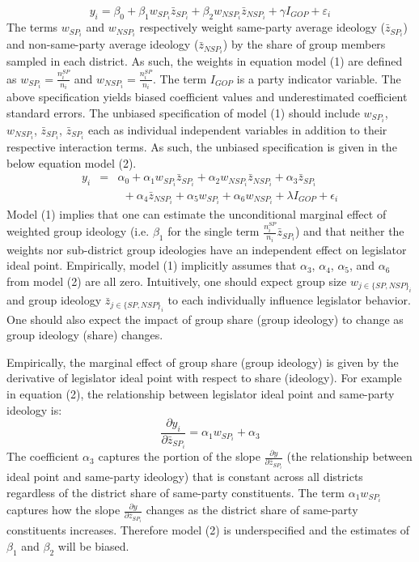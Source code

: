 \documentclass[10pt,letterpaper]{article}
\begin{document}
\begin{equation}
y_i  = \beta_0 + \beta_1 w_{SP_i} \bar{z}_{SP_i} + \beta_2 w_{NSP_i} \bar{z}_{NSP_i} + \gamma I_{GOP} + \varepsilon_i
\end{equation}
The terms $w_{SP_i}$ and $w_{NSP_i}$ respectively weight same-party average ideology ($\bar{z}_{SP_i}$) and non-same-party average ideology ($\bar{z}_{NSP_i}$) by the share of group members sampled in each district. As such, the weights in equation model (1) are defined as $w_{SP_i} = \frac{n_i^{SP}}{n_i}$ and $w_{NSP_i} =  \frac{n_i^{SP}}{n_i}$. The term $I_{GOP}$ is a party indicator variable. The above specification yields biased coefficient values and underestimated coefficient standard errors. The unbiased specification of model (1) should include $w_{SP_i}$, $w_{NSP_i}$, $\bar{z}_{SP_i}$, $\bar{z}_{SP_i}$ each as individual independent variables in addition to their respective interaction terms. As such, the unbiased specification is given in the below equation model (2).
\begin{equation}
\begin{array}{ccc}
y_i & = & \alpha_0 + \alpha_1 w_{SP_i} \bar{z}_{SP_i} + \alpha_2 w_{NSP_i} \bar{z}_{NSP_i} + \alpha_3 \bar{z}_{SP_i}~~~~~~~~~\\ 
& & ~~+ \alpha_4 \bar{z}_{NSP_i} + \alpha_5 w_{SP_i} + \alpha_6 w_{NSP_i} + \lambda I_{GOP} + \epsilon_i
\end{array}
\end{equation}
Model (1) implies that one can estimate the unconditional marginal effect of weighted group ideology (i.e. $\beta_1$ for the single term $\frac{n_i^{SP}}{n_i} \bar{z}_{SP_i}$) and that neither the weights nor sub-district group ideologies have an independent effect on legislator ideal point. Empirically, model (1) implicitly assumes that $\alpha_3$, $\alpha_4$, $\alpha_5$, and $\alpha_6$ from model (2) are all zero. Intuitively, one should expect group size $w_{j\in \{SP,NSP\}_i}$ and group ideology $\bar{z}_{j\in \{SP,NSP\}_i}$ to each individually influence legislator behavior. One should also expect the impact of group share (group ideology) to change as group ideology (share) changes.

Empirically, the marginal effect of group share (group ideology) is given by the derivative of legislator ideal point with respect to share (ideology). For example in equation (2), the relationship between legislator ideal point and same-party ideology is: 
$$\frac{\partial y_i}{\partial \bar{z}_{SP_i}}= \alpha_1 w_{SP_i} + \alpha_3$$
The coefficient $\alpha_3$ captures the portion of the slope $\frac{\partial y}{\partial \bar{z}_{SP_i}}$ (the relationship between ideal point and same-party ideology) that is constant across all districts regardless of the district share of same-party constituents. The term $\alpha_1 w_{SP_i}$ captures how the slope $\frac{\partial y}{\partial \bar{z}_{SP_i}}$ changes as the district share of same-party constituents increases. Therefore model (2) is underspecified and the estimates of $\beta_1$ and $\beta_2$ will be biased. %
\end{document}
